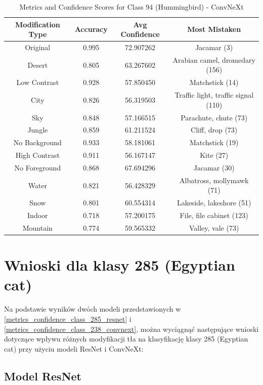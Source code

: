 \begin{table}
	\centering
	\begin{tabular}{|c|c|c|c|}
		\hline
		\textbf{Modification Type} & \textbf{Accuracy} & \textbf{Avg Confidence} & \textbf{Most Mistaken} \\
		\hline
		Original & 0.995 & 72.907262 & Jacamar (3) \\
		\hline
		Desert & 0.805 & 63.267602 & Arabian camel, dromedary (156) \\
		\hline
		Low Contrast & 0.928 & 57.850450 & Matchstick (14) \\
		\hline
		City & 0.826 & 56.319503 & Traffic light, traffic signal (110) \\
		\hline
		Sky & 0.848 & 57.166515 & Parachute, chute (73) \\
		\hline
		Jungle & 0.859 & 61.211524 & Cliff, drop (73) \\
		\hline
		No Background & 0.933 & 58.181061 & Matchstick (19) \\
		\hline
		High Contrast & 0.911 & 56.167147 & Kite (27) \\
		\hline
		No Foreground & 0.868 & 67.694296 & Jacamar (30) \\
		\hline
		Water & 0.821 & 56.428329 & Albatross, mollymawk (71) \\
		\hline
		Snow & 0.801 & 60.554314 & Lakeside, lakeshore (51) \\
		\hline
		Indoor & 0.718 & 57.200175 & File, file cabinet (123) \\
		\hline
		Mountain & 0.774 & 59.565332 & Valley, vale (73) \\
		\hline
	\end{tabular}
	\caption{Metrics and Confidence Scores for Class 94 (Hummingbird) - ConvNeXt}
	\label{tab:metrics_confidence_class_94_convnext}
\end{table}

\section*{Wnioski dla klasy 285 (Egyptian cat)}

Na podstawie wyników dwóch modeli przedstawionych w \ref*{metrics_confidence_class_285_resnet} i \ref*{metrics_confidence_class_238_convnext}, można wyciągnąć następujące wnioski dotyczące wpływu różnych 
modyfikacji tła na klasyfikację klasy 285 (Egyptian cat) przy użyciu modeli ResNet i ConvNeXt:

\subsection*{Model ResNet}

